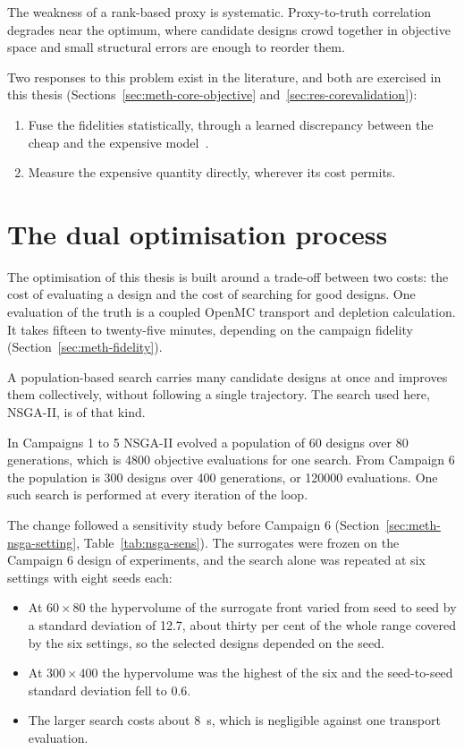 The weakness of a rank-based proxy is systematic. Proxy-to-truth
correlation degrades near the optimum, where candidate designs crowd
together in objective space and small structural errors are enough to
reorder them.

Two responses to this problem exist in the literature, and both are
exercised in this thesis (Sections~\ref{sec:meth-core-objective}
and~\ref{sec:res-corevalidation}):

\begin{enumerate}
  \item Fuse the fidelities statistically, through a learned
        discrepancy between the cheap and the expensive
        model~\cite{kennedy_ohagan_2000,forrester_book_2008}.

  \item Measure the expensive quantity directly, wherever its cost
        permits.
\end{enumerate}

\section{The dual optimisation process}
\label{sec:bg-moo}

The optimisation of this thesis is built around a trade-off between two
costs: the cost of evaluating a design and the cost of searching for
good designs. One evaluation of the truth is a coupled OpenMC transport and depletion
calculation. It takes fifteen to twenty-five minutes, depending on the
campaign fidelity (Section~\ref{sec:meth-fidelity}).

A population-based search carries many candidate designs at once and
improves them collectively, without following a single trajectory. The
search used here, NSGA-II, is of that kind.

In Campaigns 1 to 5 NSGA-II evolved a population of 60 designs over 80
generations, which is 4800 objective evaluations for one search. From
Campaign 6 the population is 300 designs over 400 generations, or
\num{120000} evaluations. One such search is performed at every
iteration of the loop.

The change followed a sensitivity study before Campaign 6
(Section~\ref{sec:meth-nsga-setting}, Table~\ref{tab:nsga-sens}). The
surrogates were frozen on the Campaign 6 design of experiments, and
the search alone was repeated at six settings with eight seeds each:

\begin{itemize}
  \item At $60\times80$ the hypervolume of the surrogate front varied
        from seed to seed by a standard deviation of 12.7, about thirty
        per cent of the whole range covered by the six settings, so the
        selected designs depended on the seed.

  \item At $300\times400$ the hypervolume was the highest of the six and
        the seed-to-seed standard deviation fell to 0.6.

  \item The larger search costs about \SI{8}{\second}, which is
        negligible against one transport evaluation.
\end{itemize}

